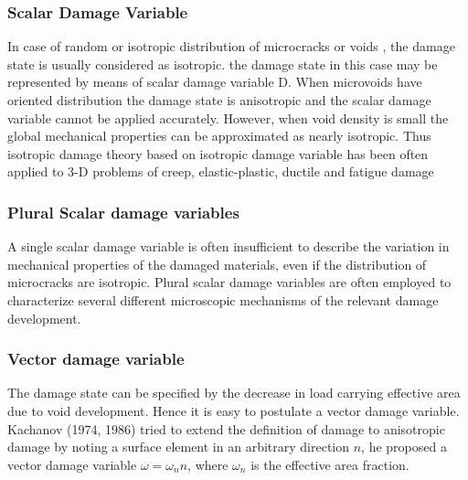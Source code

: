 \documentclass[a4paper,12pt]{article}
\begin{document}
\subsubsection{Scalar Damage Variable}
\indent\indent\indent In case of random or isotropic distribution of microcracks or voids , the damage state is usually considered as isotropic. the damage state in this case may be represented by means of scalar damage variable D. When microvoids  have oriented distribution the damage state is anisotropic and the scalar damage variable cannot be applied accurately. However, when void density is small the global mechanical properties can be approximated as nearly isotropic. Thus isotropic damage theory based on isotropic damage variable has been often applied to 3-D problems of creep, elastic-plastic, ductile and fatigue damage
\subsubsection{Plural Scalar damage variables}
\indent\indent\indent A single scalar damage variable is often insufficient to describe the variation in mechanical properties of the damaged materials, even if the distribution of microcracks are isotropic. Plural scalar damage variables are often employed to characterize several different microscopic mechanisms of the relevant damage development.
\subsubsection{Vector damage variable}
\indent\indent\indent The damage state can be specified by the decrease in load carrying effective area due to void development. Hence it is easy to postulate a vector damage variable. Kachanov (1974, 1986) tried to extend the definition of damage to anisotropic damage by noting a surface element in an arbitrary direction $n$, he proposed a vector damage variable $ \omega = \omega_{n}n$, where $\omega_{n}$ is the effective area fraction. 
\end{document}
